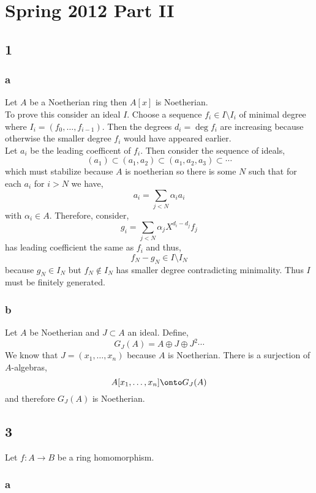 \documentclass[12pt]{article}
\begin{document}
\section{Spring 2012 Part II}

\subsection{1}

\subsubsection{a}

Let $A$ be a Noetherian ring then $A[x]$ is Noetherian.
\bigskip\\
To prove this consider an ideal $I$. Choose a sequence $f_i \in I \setminus I_i$ of minimal degree where $I_i = (f_0, \dots, f_{i-1})$. Then the degrees $d_i = \deg{f_i}$ are increasing because otherwise the smaller degree $f_i$ would have appeared earlier.
\bigskip\\
Let $a_i$ be the leading coefficent of $f_i$. Then consider the sequence of ideals,
\[ (a_1) \subset (a_1, a_2) \subset (a_1, a_2, a_3) \subset \cdots \]
which must stabilize because $A$ is noetherian so there is some $N$ such that for each $a_i$ for $i > N$ we have,
\[ a_i = \sum_{j < N} \alpha_i a_i \]
with $\alpha_i \in A$. Therefore, consider,
\[ g_i = \sum_{j < N} \alpha_j X^{d_i - d_j} f_j \]
has leading coefficient the same as $f_i$ and thus,
\[ f_N - g_N \in I \setminus I_N \]
because $g_N \in I_N$ but $f_N \notin I_N$ has smaller degree contradicting minimality. Thus $I$ must be finitely generated.

\subsubsection{b}

Let $A$ be Noetherian and $J \subset A$ an ideal. Define,
\[ G_J(A) = A \oplus J \oplus J^2 \cdots \]
We know that $J = (x_1, \dots, x_n)$ because $A$ is Noetherian. There is a surjection of $A$-algebras,
\[ A[x_1, \dots, x_n] \onto G_J(A) \]
and therefore $G_J(A)$ is Noetherian.

\subsection{3}

Let $f : A \to B$ be a ring homomorphism.

\subsubsection{a}
\end{document}

